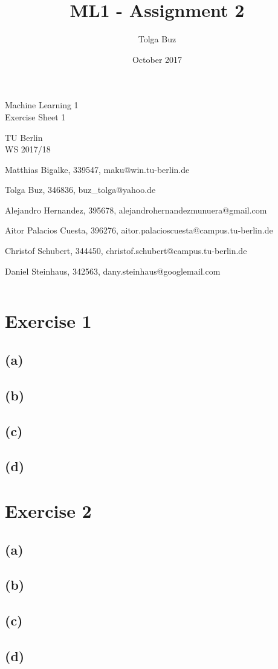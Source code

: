 \documentclass{article}
\title{ML1 - Assignment 2}
\author{Tolga Buz}
\date{October 2017}
\begin{document}
\begin{centering}
\begin{LARGE}
Machine Learning 1 \\
Exercise Sheet 1 \\
\end{LARGE}
\vspace{0.5cm}
TU Berlin\\
WS 2017/18
\vspace{0.5cm}

\begin{description}
\item[Group: BSSBCH]
\item Matthias Bigalke, 339547, maku@win.tu-berlin.de 
\item Tolga Buz, 346836, buz\_tolga@yahoo.de 
\item Alejandro Hernandez, 395678, alejandrohernandezmunuera@gmail.com 
\item Aitor Palacios Cuesta, 396276, aitor.palacioscuesta@campus.tu-berlin.de 
\item Christof Schubert, 344450, christof.schubert@campus.tu-berlin.de 
\item Daniel Steinhaus, 342563, dany.steinhaus@googlemail.com 
\end{description}
\end{centering}

\begin{verbatim}
\end{verbatim}

\section*{Exercise 1}
\subsection*{(a)}
\subsection*{(b)}
\subsection*{(c)}
\subsection*{(d)}
\section*{Exercise 2}
\subsection*{(a)}
\subsection*{(b)}
\subsection*{(c)}
\subsection*{(d)}
\end{document}
